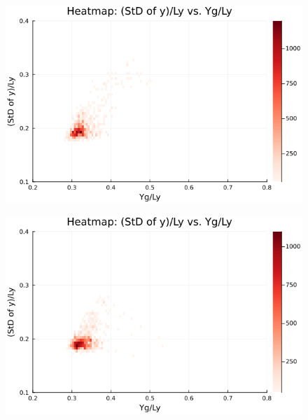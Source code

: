 \begin{figure}[H]
  \centering
  \includegraphics[scale=0.6]{image/RaRtmap_heat/2023-11-14T21:54:59.835__chi1.265_Ay50_rho0.4_T0.43_dT0.04_Rd0.0_Rt0.0_Ra1.877538_g0.0003999718779659611_run4.0e7_output.png}
  \label{}
\end{figure}

\begin{figure}[H]
  \centering
  \includegraphics[scale=0.6]{image/RaRtmap_heat/2023-11-14T22:51:24.191__chi1.265_Ay50_rho0.4_T0.43_dT0.04_Rd0.0_Rt0.125_Ra0.0_g0.0003999718779659611_run4.0e7_output.png}
  \label{}
\end{figure}

